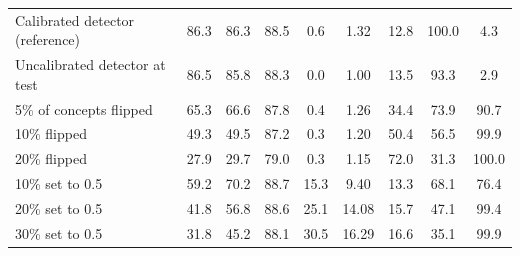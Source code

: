 \begin{table}[t]
\begin{tabular}{@{}lcccccccc@{}}
Calibrated detector (reference) & 86.3 & 86.3 & 88.5 & 0.6 & 1.32 & 12.8 & 100.0 & 4.3\\
Uncalibrated detector at test & 86.5 & 85.8 & 88.3 & 0.0 & 1.00 & 13.5 & 93.3 & 2.9\\
5\% of concepts flipped & 65.3 & 66.6 & 87.8 & 0.4 & 1.26 & 34.4 & 73.9 & 90.7\\
10\% flipped & 49.3 & 49.5 & 87.2 & 0.3 & 1.20 & 50.4 & 56.5 & 99.9\\
20\% flipped & 27.9 & 29.7 & 79.0 & 0.3 & 1.15 & 72.0 & 31.3 & 100.0\\
10\% set to 0.5 & 59.2 & 70.2 & 88.7 & 15.3 & 9.40 & 13.3 & 68.1 & 76.4\\
20\% set to 0.5 & 41.8 & 56.8 & 88.6 & 25.1 & 14.08 & 15.7 & 47.1 & 99.4\\
30\% set to 0.5 & 31.8 & 45.2 & 88.1 & 30.5 & 16.29 & 16.6 & 35.1 & 99.9\\
\bottomrule
\end{tabular}
\end{table}
